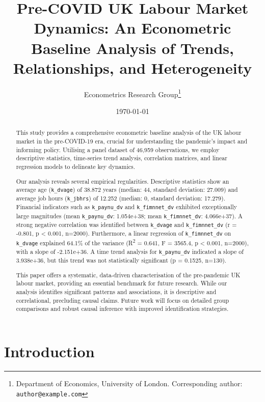 \documentclass[11pt,a4paper]{article}
\title{Pre-COVID UK Labour Market Dynamics: An Econometric Baseline Analysis of Trends, Relationships, and Heterogeneity}
\author{Econometrics Research Group\thanks{Department of Economics, University of London. Corresponding author: \texttt{author@example.com}}}
\date{\today}
\begin{document}
\maketitle

\begin{abstract}
This study provides a comprehensive econometric baseline analysis of the UK labour market in the pre-COVID-19 era, crucial for understanding the pandemic's impact and informing policy. Utilising a panel dataset of 46,959 observations, we employ descriptive statistics, time-series trend analysis, correlation matrices, and linear regression models to delineate key dynamics.

Our analysis reveals several empirical regularities. Descriptive statistics show an average age (\texttt{k\_dvage}) of 38.872 years (median: 44, standard deviation: 27.009) and average job hours (\texttt{k\_jbhrs}) of 12.252 (median: 0, standard deviation: 17.279). Financial indicators such as \texttt{k\_paynu\_dv} and \texttt{k\_fimnnet\_dv} exhibited exceptionally large magnitudes (mean \texttt{k\_paynu\_dv}: 1.054e+38; mean \texttt{k\_fimnnet\_dv}: 4.066e+37). A strong negative correlation was identified between \texttt{k\_dvage} and \texttt{k\_fimnnet\_dv} (r = -0.801, p < 0.001, n=2000). Furthermore, a linear regression of \texttt{k\_fimnnet\_dv} on \texttt{k\_dvage} explained 64.1\% of the variance (R\textsuperscript{2} = 0.641, F = 3565.4, p < 0.001, n=2000), with a slope of -2.151e+36. A time trend analysis for \texttt{k\_paynu\_dv} indicated a slope of 3.938e+36, but this trend was not statistically significant (p = 0.1525, n=130).

This paper offers a systematic, data-driven characterisation of the pre-pandemic UK labour market, providing an essential benchmark for future research. While our analysis identifies significant patterns and associations, it is descriptive and correlational, precluding causal claims. Future work will focus on detailed group comparisons and robust causal inference with improved identification strategies.
\end{abstract}

\section{Introduction}
\end{document}
